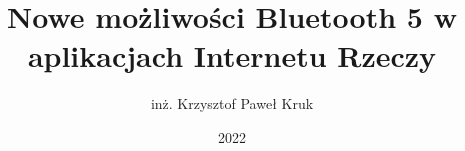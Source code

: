\documentclass[thesis=mgr,faculty=ee]{EE-dyplom}
\title{Nowe możliwości Bluetooth 5 w aplikacjach Internetu Rzeczy}
\author{inż. Krzysztof Paweł Kruk}
\date{2022}
\begin{document}
    \frontpages

    

    \bibliografia

    
    \acronymslist
    \listoffigures
    \listoftables
    \easyappendices
\end{document}
